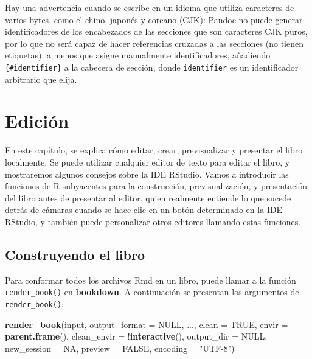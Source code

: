 \documentclass[12pt,]{krantz}
\makeatletter
\newenvironment{Shaded}{\begin{snugshade}}{\end{snugshade}}
\newcommand{\KeywordTok}[1]{\textcolor[rgb]{0.13,0.29,0.53}{\textbf{{#1}}}}
\newcommand{\DataTypeTok}[1]{\textcolor[rgb]{0.13,0.29,0.53}{{#1}}}
\newcommand{\StringTok}[1]{\textcolor[rgb]{0.31,0.60,0.02}{{#1}}}
\newcommand{\OtherTok}[1]{\textcolor[rgb]{0.56,0.35,0.01}{{#1}}}
\newcommand{\NormalTok}[1]{{#1}}
\newenvironment{kframe}{%
\medskip{}
\setlength{\fboxsep}{.8em}
 \def\at@end@of@kframe{}%
 \ifinner\ifhmode%
  \def\at@end@of@kframe{\end{minipage}}%
  \begin{minipage}{\columnwidth}%
 \fi\fi%
 \def\FrameCommand##1{\hskip\@totalleftmargin \hskip-\fboxsep
 \colorbox{shadecolor}{##1}\hskip-\fboxsep
     \hskip-\linewidth \hskip-\@totalleftmargin \hskip\columnwidth}%
 \MakeFramed {\advance\hsize-\width
   \@totalleftmargin\z@ \linewidth\hsize
   \@setminipage}}%
 {\par\unskip\endMakeFramed%
 \at@end@of@kframe}
\renewenvironment{Shaded}{\begin{kframe}}{\end{kframe}}
\theoremstyle{definition}
\theoremstyle{definition}
\theoremstyle{remark}
\makeatother
\begin{document}
Hay una advertencia cuando se escribe en un idioma que utiliza
caracteres de varios bytes, como el chino, japonés y coreano (CJK):
Pandoc no puede generar identificadores de los encabezados de las
secciones que son caracteres CJK puros, por lo que no será capaz de
hacer referencias cruzadas a las secciones (no tienen etiquetas), a
menos que asigne manualmente identificadores, añadiendo
\texttt{\{\#identifier\}} a la cabecera de sección, donde
\texttt{identifier} es un identificador arbitrario que elija.

\chapter{Edición}\label{edicion}

En este capítulo, se explica cómo editar, crear, previsualizar y
presentar el libro localmente. Se puede utilizar cualquier editor de
texto para editar el libro, y mostraremos algunos consejos sobre la IDE
RStudio. Vamos a introducir las funciones de R subyacentes para la
construcción, previsualización, y presentación del libro antes de
presentar al editor, quien realmente entiende lo que sucede detrás de
cámaras cuando se hace clic en un botón determinado en la IDE RStudio, y
también puede personalizar otros editores llamando estas funciones.

\section{Construyendo el libro}\label{construyendo-el-libro}

Para conformar todos los archivos Rmd en un libro, puede llamar a la
función \texttt{render\_book()} en \textbf{bookdown}. A continuación se
presentan los argumentos de \texttt{render\_book()}:

\begin{Shaded}
\begin{Highlighting}[]
\KeywordTok{render_book}\NormalTok{(input, }\DataTypeTok{output_format =} \OtherTok{NULL}\NormalTok{, ..., }\DataTypeTok{clean =} \OtherTok{TRUE}\NormalTok{, }
  \DataTypeTok{envir =} \KeywordTok{parent.frame}\NormalTok{(), }\DataTypeTok{clean_envir =} \NormalTok{!}\KeywordTok{interactive}\NormalTok{(), }
  \DataTypeTok{output_dir =} \OtherTok{NULL}\NormalTok{, }\DataTypeTok{new_session =} \OtherTok{NA}\NormalTok{, }\DataTypeTok{preview =} \OtherTok{FALSE}\NormalTok{, }
  \DataTypeTok{encoding =} \StringTok{"UTF-8"}\NormalTok{)}
\end{Highlighting}
\end{Shaded}
\end{document}
